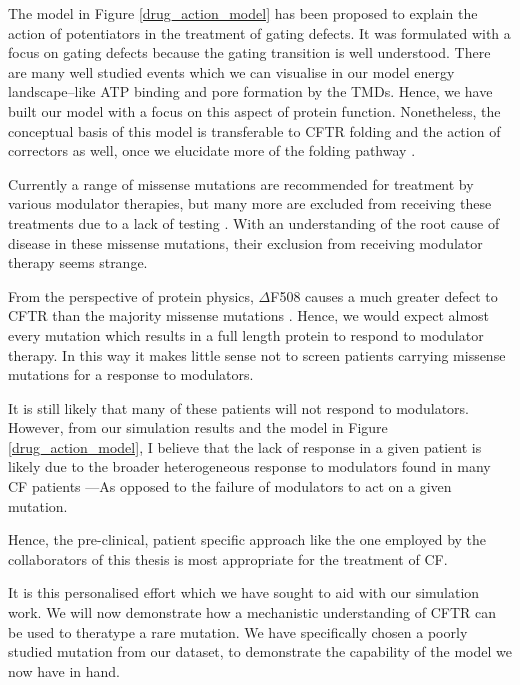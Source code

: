 The model in Figure \ref {drug_action_model} has been proposed to explain the action of potentiators in the treatment of gating defects. It was formulated with a focus on gating defects because the gating transition is well understood. There are many well studied events which we can visualise in our model energy landscape--like ATP binding and pore formation by the TMDs. Hence, we have built our model with a focus on this aspect of protein function. Nonetheless, the conceptual basis of this model is transferable to CFTR folding and the action of correctors as well, once we elucidate more of the folding pathway \cite{krainer2018, kleizen2021, kleizen2020, padanyi2022, fiedorczuk2022}. 

Currently a range of missense mutations are recommended for treatment by various modulator therapies, but many more are excluded from receiving these treatments due to a lack of testing \cite{trikafta_FDA_info, kalydeco_FDA_approval, vangoor2014}. With an understanding of the root cause of disease in these missense mutations, their exclusion from receiving modulator therapy seems strange.

From the perspective of protein physics, $\Delta$F508 causes a much greater defect to CFTR than the majority missense mutations \cite{bahia2021}. Hence, we would expect almost every mutation which results in a full length protein to respond to modulator therapy. In this way it makes little sense not to screen patients carrying missense mutations for a response to modulators. 

It is still likely that many of these patients will not respond to modulators. However, from our simulation results and the model in Figure \ref{drug_action_model}, I believe that the lack of response  in a given patient is likely due to the broader heterogeneous response to modulators found in many CF patients \cite{boyle2014, donaldson2018, keating2018, matthes2018}---As opposed to the failure of modulators to act on a given mutation. 

Hence, the pre-clinical, patient specific approach like the one employed by the collaborators of this thesis is most appropriate for the treatment of CF. 

It is this personalised effort which we have sought to aid with our simulation work. We will now demonstrate how a mechanistic understanding of CFTR can be used to theratype a rare mutation. We have specifically chosen a poorly studied mutation from our dataset, to demonstrate the capability of the model we now have in hand. 

